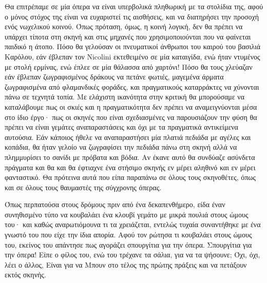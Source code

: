 Θα επιτρέπαμε σε μία όπερα να είναι υπερβολικά πληθωρική με τα στολίδια της, αφού ο μόνος στόχος της είναι να ευχαριστεί τις αισθήσεις, και να διατηρήσει την προσοχή ενός νωχελικού κοινού. Όπως πρόταση, όμως, η κοινή λογική, δεν θα πρέπει να υπάρχει τίποτα στη σκηνή και στις μηχανές που χρησιμοποιούνται που να φαίνεται παιδικό η άτοπο. Πόσο θα γελούσαν οι πνευματικοί άνθρωποι του καιρού του βασιλιά Καρόλου, εάν έβλεπαν τον Nicolini εκτεθειμένο σε μία καταιγίδα, ενώ ήταν ντυμένος με στολή ερμίνας, ενώ έπλεε σε μία θάλασσα από χαρτόνι! Πόσο θα τους χλεύαζαν εάν έβλεπαν ζωγραφισμένος δράκους να πετάνε φωτιές, μαγεμένα άρματα ζωγραφισμένα από φλαμανδικές φοράδες, και πραγματικούς καταρράκτες να χύνονται πάνω σε τεχνητά τοπία. Με ελάχιστη ικανότητα στην κριτική θα μπορούσαμε να καταλάβουμε πως οι σκιές και η πραγματικότητα δεν πρέπει να αναμειγνύονται μέσα στο ίδιο έργο· πως οι σκηνές που είναι σχεδιασμένες να παρουσιάζουν την φύση θα πρέπει να είναι γεμάτες αναπαραστάσεις και όχι με τα πραγματικά αντικείμενα αυτούσια. Εάν κάποιος ήθελε να αναπαραστήσει μία πλατιά πεδιάδα με αγέλες και κοπάδια, θα ήταν γελοίο να ζωγραφίσει την πεδιάδα πάνω στη σκηνή αλλά να πλημμυρίσει το σανίδι με πρόβατα και βόδια. Αν έκανε αυτό θα συνδύαζε ασύνδετα πράγματα και θα και θα έφτιαχνε ένα στήσιμο σκηνής εν μέρει αληθινό και εν μέρει φανταστικό. Θα πρότεινα αυτά που είπα παραπάνω σε όλους τους σκηνοθέτες, όπως και σε όλους τους θαυμαστές της σύγχρονης όπερας.

Όπως περπατούσα στους δρόμους πριν από ένα δεκαπενθήμερο, είδα έναν συνηθισμένο τύπο να κουβαλάει ένα κλουβί γεμάτο με μικρά πουλιά στους ώμους του· και καθώς αναρωτιόμουνα τι τα χρειάζεται, εντελώς τυχαία συναντήθηκε με ένα γνωστό του που είχε την ίδια απορία. Αφού τον ρώτησα τι κουβαλάει στους ώμους του, εκείνος του απάντησε πως αγοράζει σπουργίτια για την όπερα. Σπουργίτια για την όπερα! Είπε ο φίλος του, ενώ του τρέχανε τα σάλια, για να τα ψήσουνε; Όχι, όχι, λέει ο άλλος, Είναι για να Μπουν στο τέλος της πρώτης πράξεις και να πετάξουν εκτός σκηνής.

